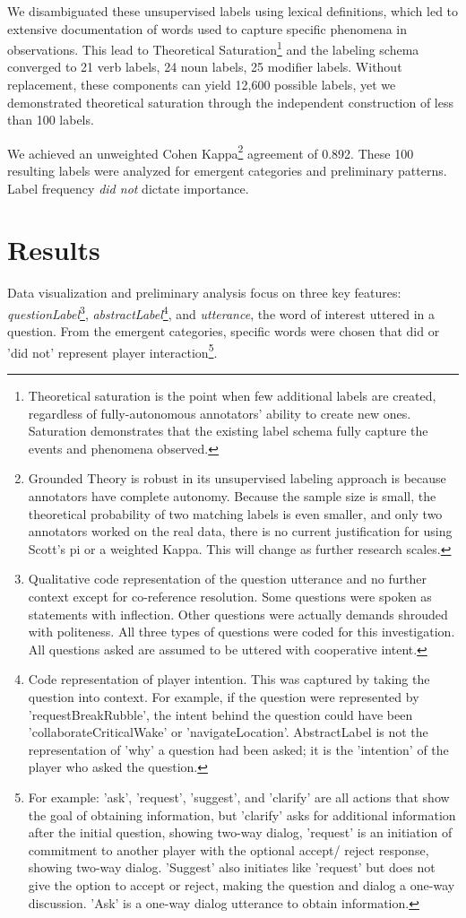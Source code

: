 We disambiguated these unsupervised labels using lexical definitions, which led to extensive
documentation of words used to capture specific phenomena in observations. This lead to Theoretical Saturation\footnote{Theoretical saturation is the point when few additional labels are created, regardless of fully-autonomous annotators' ability to create new ones. Saturation demonstrates that the existing label schema fully capture the events and phenomena observed.} and the labeling schema converged to 21 verb
labels, 24 noun labels, 25 modifier labels. Without replacement, these
components can yield 12,600 possible labels, yet we demonstrated theoretical
saturation through the independent construction of less than 100 labels.

We achieved an unweighted Cohen Kappa\footnote{Grounded Theory is robust in its
unsupervised labeling approach is because annotators have complete autonomy.
Because the sample size is small, the theoretical probability of two matching
labels is even smaller, and only two annotators worked on the real data, there
is no current justification for using Scott's pi or a weighted Kappa. This will
change as further research scales.} agreement of 0.892. These 100 resulting labels were analyzed for
emergent categories and preliminary patterns. Label frequency \emph{did not}
dictate importance. 

\section{Results}
Data visualization and preliminary analysis focus on three
key features: \textit{questionLabel}\footnote{Qualitative code representation of the
question utterance and no further context except for co-reference resolution.
Some questions were spoken as statements with inflection. Other questions were
actually demands shrouded with politeness. All three types of questions were
coded for this investigation. All questions asked are assumed to be uttered
with cooperative intent.}, \textit{abstractLabel}\footnote{Code representation of
player intention. This was captured by taking the question into context. For
example, if the question were represented by 'requestBreakRubble', the intent
behind the question could have been 'collaborateCriticalWake' or
'navigateLocation'. AbstractLabel is not the representation of 'why' a
question had been asked; it is the 'intention' of the player who asked the
question.}, and \textit{utterance}, the word of interest uttered in a question. From
the emergent categories, specific words were chosen that did or 'did not'
represent player interaction\footnote{For example: 'ask', 'request',
'suggest', and 'clarify' are all actions that show the goal of
obtaining information, but 'clarify' asks for additional information after the
initial question, showing two-way dialog, 'request' is an initiation of
commitment to another player with the optional accept/ reject response, showing
two-way dialog. 'Suggest' also initiates like 'request' but does not give the
option to accept or reject, making the question and dialog a one-way
discussion. 'Ask' is a one-way dialog utterance to obtain information.}. 





